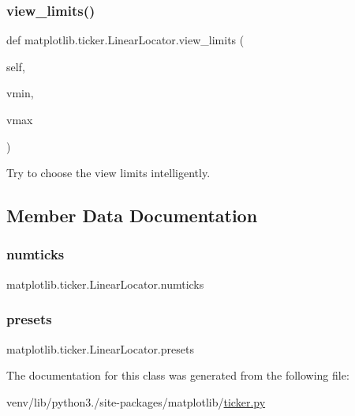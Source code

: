 \subsubsection{\texorpdfstring{view\+\_\+limits()}{view\_limits()}}
{\footnotesize\ttfamily def matplotlib.\+ticker.\+Linear\+Locator.\+view\+\_\+limits (\begin{DoxyParamCaption}\item[{}]{self,  }\item[{}]{vmin,  }\item[{}]{vmax }\end{DoxyParamCaption})}

\begin{DoxyVerb}Try to choose the view limits intelligently.\end{DoxyVerb}
 

\subsection{Member Data Documentation}
\mbox{\label{classmatplotlib_1_1ticker_1_1LinearLocator_a3262ce758d5e43beefb69c523fe3d8ab}} 
\subsubsection{\texorpdfstring{numticks}{numticks}}
{\footnotesize\ttfamily matplotlib.\+ticker.\+Linear\+Locator.\+numticks}

\mbox{\label{classmatplotlib_1_1ticker_1_1LinearLocator_a36e9a6ff0881ba6935c7d11a48126ebe}} 
\subsubsection{\texorpdfstring{presets}{presets}}
{\footnotesize\ttfamily matplotlib.\+ticker.\+Linear\+Locator.\+presets}



The documentation for this class was generated from the following file\+:\begin{DoxyCompactItemize}
\item 
venv/lib/python3./site-\/packages/matplotlib/\hyperlink{ticker_8py}{ticker.\+py}\end{DoxyCompactItemize}
